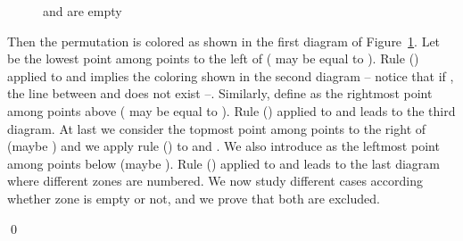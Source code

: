\documentclass[11pt]{article}
\newenvironment{pf}{{\em \noindent Proof:}}{ \hfill \qed\smallskip}
\newcommand{\rmnum}[1]{\romannumeral #1}
\newcommand{\Hpoint}[2]{\draw (#1,#2) [darkred,fill=darkred] circle (3pt);}
\newcommand{\zoneRG}[3]{
\draw [very thick,H,Hpoint] (#1,#2) -- +(-#3,0);
\draw [very thick,V,Vpoint] (#1,#2) -- +(0,#3);
\draw [Hfill] (#1,#2) -- +(-#3,#3) -- +(-#3,0);
\draw [Vfill] (#1,#2) -- +(-#3,#3) -- + (0,#3);
}
\newcommand{\zoneGR}[3]{
\draw [very thick,H,Hpoint] (#1,#2) -- +(-#3,0);
\draw [very thick,V,Vpoint] (#1,#2) -- +(0,#3);
\draw [Vfill] (#1,#2) -- +(-#3,#3) -- +(-#3,0);
\draw [Hfill] (#1,#2) -- +(-#3,#3) -- + (0,#3);
}
\begin{document}
\begin{pf}
\begin{figure}[H]
\begin{center}
\caption{ and  are empty\label{fig:ABempty}}
\end{center}
\end{figure}
Then the permutation is colored as shown in the first diagram of Figure~\ref{fig:ABempty}.
Let  be the lowest point among points to the left of  ( may be equal to ). 
Rule (\rmnum{2}) applied to  and  implies the coloring shown in the second diagram 
-- notice that if , the line between  and  does not exist --. 
Similarly, define  as the rightmost point among points above  ( may be equal to ). 
Rule (\rmnum{1}) applied to  and  leads to the third diagram.
At last we consider the topmost point  among points to the right of  (maybe ) and we apply rule (\rmnum{2}) to  and . 
We also introduce  as the leftmost point among points below  (maybe ). 
Rule (\rmnum{1}) applied to  and  leads to the last diagram where different zones are numbered.
We now study different cases according whether zone  is empty or not, and we prove that both are excluded.



\end{pf}
\end{document}
